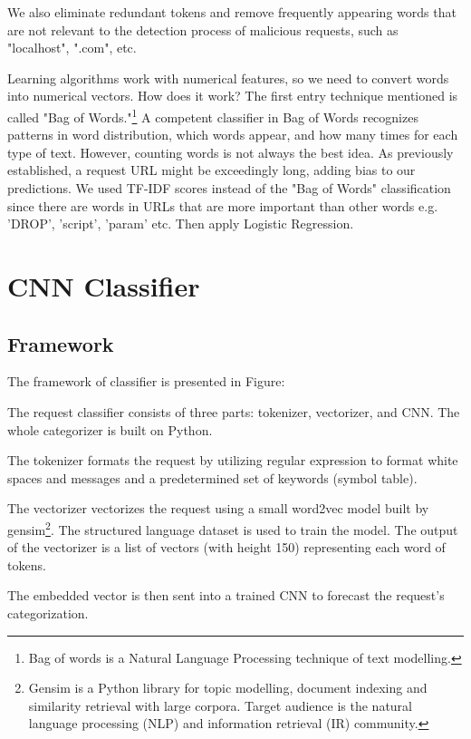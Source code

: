We also eliminate redundant tokens and remove frequently appearing words that are not relevant to the detection process of malicious requests, such as "localhost", ".com", etc.

Learning algorithms work with numerical features, so we need to convert words into numerical vectors. How does it work? The first entry technique mentioned is called "Bag of Words."\footnote{Bag of words is a Natural Language Processing technique of text modelling.}
A competent classifier in Bag of Words recognizes patterns in word distribution, which words appear, and how many times for each type of text. However, counting words is not always the best idea. As previously established, a request URL might be exceedingly long, adding bias to our predictions. We used TF-IDF scores instead of the "Bag of Words" classification since there are words in URLs that are more important than other words e.g. 'DROP', 'script', 'param' etc. Then apply Logistic Regression.

\section{CNN Classifier}
\label{sec:cnn_classfier}

\subsection{Framework}
The framework of classifier is presented in Figure:

The request classifier consists of three parts: tokenizer, vectorizer, and CNN. The whole categorizer is built on Python.

The tokenizer formats the request by utilizing regular expression to format white spaces and messages and a predetermined set of keywords (symbol table).

The vectorizer vectorizes the request using a small word2vec model built by gensim\footnote{Gensim is a Python library for topic modelling, document indexing and similarity retrieval with large corpora. Target audience is the natural language processing (NLP) and information retrieval (IR) community.}. The structured language dataset is used to train the model. The output of the vectorizer is a list of vectors (with height 150) representing each word of tokens.

The embedded vector is then sent into a trained CNN to forecast the request's categorization.



